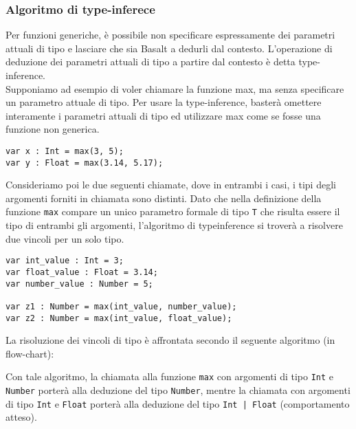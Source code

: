 \subsubsection{Algoritmo di type-inferece}
Per funzioni generiche, è possibile non specificare espressamente dei parametri 
attuali di tipo e lasciare che sia Basalt a dedurli dal contesto. 
L’operazione di deduzione dei parametri attuali di tipo a partire dal 
contesto è detta type-inference. \\

Supponiamo ad esempio di voler chiamare la funzione max, ma 
senza specificare un parametro attuale di tipo. 
Per usare la type-inference, basterà omettere interamente i parametri attuali di 
tipo ed utilizzare max come se fosse una funzione non generica. \\

\vspace{0.5cm}
\begin{lstlisting}[frame=single]
var x : Int = max(3, 5);
var y : Float = max(3.14, 5.17);
\end{lstlisting}
\vspace{0.5cm}

Consideriamo poi le due seguenti chiamate, dove in entrambi i casi, 
i tipi degli argomenti forniti in chiamata sono distinti. Dato che nella definizione della 
funzione \texttt{max} compare un unico parametro formale di tipo \texttt{T} che risulta essere 
il tipo di entrambi gli argomenti, l'algoritmo di typeinference si troverà a risolvere due vincoli
per un solo tipo.\\

\vspace{0.5cm}
\begin{lstlisting}[frame=single]
var int_value : Int = 3;
var float_value : Float = 3.14;
var number_value : Number = 5;

var z1 : Number = max(int_value, number_value);
var z2 : Number = max(int_value, float_value);
\end{lstlisting}
\vspace{0.5cm}
 
La risoluzione dei vincoli di tipo è affrontata secondo il seguente algoritmo (in flow-chart):


\vspace{0.5cm}

Con tale algoritmo, la chiamata alla funzione \texttt{max} con argomenti di tipo \texttt{Int} e \texttt{Number}
porterà alla deduzione del tipo \texttt{Number}, mentre la chiamata con argomenti di tipo \texttt{Int} 
e \texttt{Float} porterà alla deduzione del tipo \texttt{Int | Float} (comportamento atteso).\\
